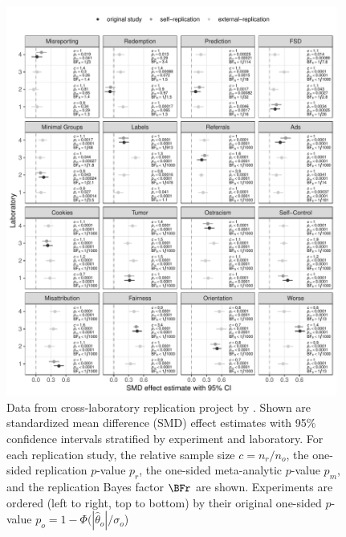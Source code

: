 \begin{figure}[!htb]
\begin{knitrout}
\color{fgcolor}
\includegraphics[width=0.97\textwidth]{images/paper3/analysis-protzko-1}
\end{knitrout}
\caption{Data from cross-laboratory replication project by \citet{Protzko2020}.
  Shown are standardized mean difference (SMD) effect estimates with 95\%
  confidence intervals stratified by experiment and laboratory. For each
  replication study, the relative sample size $c = n_{r}/n_{o}$, the one-sided
  replication $p$-value $p_{r}$, the one-sided meta-analytic $p$-value $p_{m}$,
  and the replication Bayes factor $\BFr$ are shown. Experiments are ordered
  (left to right, top to bottom) by their original one-sided $p$-value
  $p_{o} = 1 - \Phi(|\hat{\theta}_{o}|/\sigma_{o}$)}
\label{fig:data}
\end{figure}


